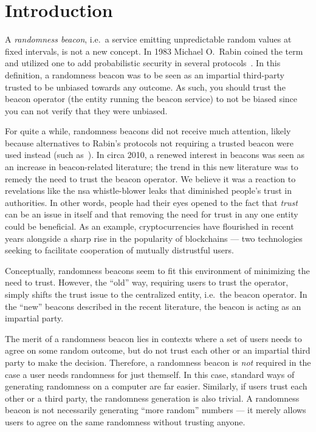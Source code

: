 \section{Introduction}
A \emph{randomness beacon}, i.e.\ a service emitting unpredictable random values at fixed intervals, is not a new concept.
In 1983 Michael O.\ Rabin coined the term and utilized one to add probabilistic security in several protocols~\cite{rabin1983transaction}.
In this definition, a randomness beacon was to be seen as an impartial third-party trusted to be unbiased towards any outcome.
As such, you should trust the beacon operator (the entity running the beacon service) to not be biased since you can not verify that they were unbiased.

For quite a while, randomness beacons did not receive much attention, likely because alternatives to Rabin's protocols not requiring a trusted beacon were used instead (such as~\cite{BGMR}).
In circa 2010, a renewed interest in beacons was seen as an increase in beacon-related literature; the trend in this new literature was to remedy the need to trust the beacon operator.
We believe it was a reaction to revelations like the \gls{nsa} whistle-blower leaks that diminished people's trust in authorities.
In other words, people had their eyes opened to the fact that \emph{trust} can be an issue in itself and that removing the need for trust in any one entity could be beneficial.
As an example, cryptocurrencies have flourished in recent years alongside a sharp rise in the popularity of blockchains --- two technologies seeking to facilitate cooperation of mutually distrustful users.

Conceptually, randomness beacons seem to fit this environment of minimizing the need to trust.
However, the \enquote{old} way, requiring users to trust the operator, simply shifts the trust issue to the centralized entity, i.e.\ the beacon operator.
In the \enquote{new} beacons described in the recent literature, the beacon is acting as an impartial party.

The merit of a randomness beacon lies in contexts where a set of users needs to agree on some random outcome, but do not trust each other or an impartial third party to make the decision.
Therefore, a randomness beacon is \emph{not} required in the case a user needs randomness for just themself. In this case, standard ways of generating randomness on a computer are far easier.
Similarly, if users trust each other or a third party, the randomness generation is also trivial.
A randomness beacon is not necessarily generating \enquote{more random} numbers --- it merely allows users to agree on the same randomness without trusting anyone.

